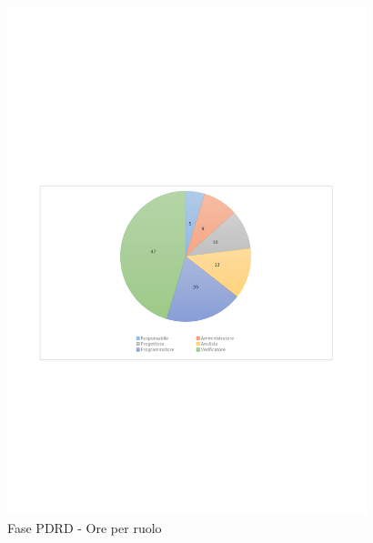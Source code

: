 \documentclass[../PianoProgetto.tex]{subfiles}
\begin{document}
	\begin{figure}[H]
		\centering
		\includegraphics[width=0.93\textwidth , trim=1.5cm 9cm 1.5cm 9cm]{grafici/PDRD/PDRD-ore-ruolo}
			\caption{Fase PDRD - Ore per ruolo}
		\label{fig:CircleChart-fasePDRD_ore_r}
	\end{figure}
\vfill	
\newpage
\vfill
\end{document}
